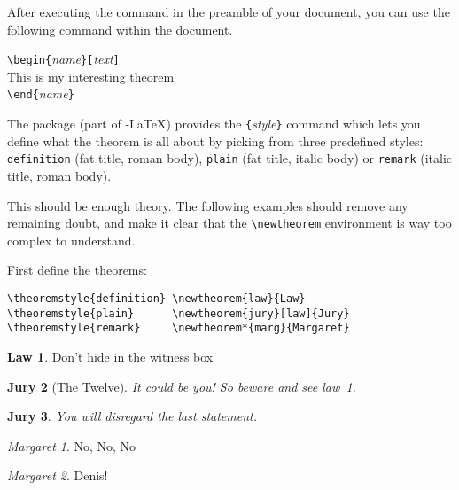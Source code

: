 After executing the  command in the preamble of your
document, you can use the following command within the document.
\begin{code}
\verb|\begin{|\emph{name}\verb|}[|\emph{text}\verb|]|\\
This is my interesting theorem\\
\verb|\end{|\emph{name}\verb|}|     
\end{code}

The  package (part of \AmS-\LaTeX) provides the 
\verb|{|\emph{style}\verb|}|
command which lets you define what the theorem is all about by picking
from three predefined styles: \texttt{definition} (fat title, roman body),
\texttt{plain} (fat title, italic body) or \texttt{remark} (italic
title, roman body).

This should be enough theory. The following examples should
remove any remaining doubt, and make it clear that the
\verb|\newtheorem| environment is way too complex to understand.

\theoremstyle{definition} \newtheorem{law}{Law}
\theoremstyle{plain}      \newtheorem{jury}[law]{Jury}
\theoremstyle{remark}     \newtheorem*{marg}{Margaret}

First define the theorems:

\begin{verbatim}
\theoremstyle{definition} \newtheorem{law}{Law}
\theoremstyle{plain}      \newtheorem{jury}[law]{Jury}
\theoremstyle{remark}     \newtheorem*{marg}{Margaret}
\end{verbatim}

\begin{example}
\begin{law} \label{law:box}
Don't hide in the witness box
\end{law}
\begin{jury}[The Twelve]
It could be you! So beware and
see law~\ref{law:box}.\end{jury}
\begin{jury}
You will disregard the last
statement.\end{jury}
\begin{marg}No, No, No\end{marg}
\begin{marg}Denis!\end{marg}
\end{example}

